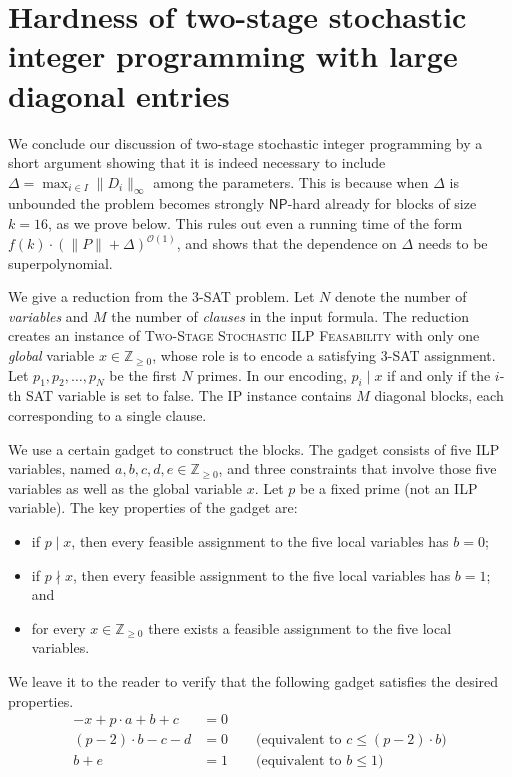 \documentclass{article}
\renewcommand{\leq}{\leqslant}
\renewcommand{\geq}{\geqslant}
\newcommand{\Z}{\mathbb{Z}}
\newcommand{\Zn}{\Z_{\geq 0}}
\newcommand{\Oh}{{\mathcal{O}}}
\newcommand{\stageFeas}{\textsc{Two-Stage Stochastic ILP Feasability}}
\begin{document}
\section{Hardness of two-stage stochastic integer programming with large diagonal entries}
\label{sec:nphard}

We conclude our discussion of two-stage stochastic integer programming by a short argument showing that it is indeed necessary to include $\Delta=\max_{i\in I} \|D_i\|_\infty$ among the parameters. This is because when $\Delta$ is unbounded the problem becomes strongly $\mathsf{NP}$-hard already for blocks of size $k=16$, as we prove below. This rules out even a running time of the form $f(k) \cdot (\|P\|+ \Delta)^{\Oh(1)}$, and shows that the dependence on $\Delta$ needs to be superpolynomial.

We give a reduction from the 3-SAT problem. Let $N$ denote the number of \emph{variables} and $M$ the number of \emph{clauses} in the input formula. The reduction creates an instance of \stageFeas{} with only one \emph{global} variable $x \in \Zn$, whose role is to encode a satisfying 3-SAT assignment. Let $p_1, p_2, \ldots, p_N$ be the first $N$ primes. In our encoding, $p_i \mid x$ if and only if the $i$-th SAT variable is set to false. The IP instance contains $M$ diagonal blocks, each corresponding to a single clause.

We use a certain gadget to construct the blocks. The gadget consists of five ILP variables, named $a,b,c,d,e\in \Zn$, and three constraints that involve those five variables as well as the global variable $x$. Let $p$ be a fixed prime (not an ILP variable). The key properties of the gadget are:
\begin{itemize}[nosep]
\item if $p \mid x$, then every feasible assignment to the five local variables has $b=0$;
\item if $p \nmid x$,  then every feasible assignment to the five local variables has $b=1$; and
\item for every $x \in \Zn$ there exists a feasible assignment to the five local variables.
\end{itemize}
We leave it to the reader to verify that the following gadget satisfies the desired properties.
\begin{align*}
-x + p \cdot a + b + c & = 0 \\
(p-2) \cdot b - c - d &= 0 \qquad \text{(equivalent to $c \leq (p-2) \cdot b$)} \\
b + e &= 1 \qquad \text{(equivalent to $b \leq 1$)}
\end{align*}
\end{document}
